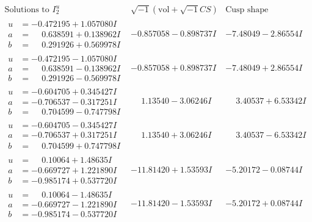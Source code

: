 \documentclass[1p]{elsarticle_modified}
\theoremstyle{definition}
\newcommand{\I}{\sqrt{-1}}
\begin{document}
$$\begin{array}{c|c|c}  
\text{Solutions to }I^u_{2}& \I (\text{vol} + \sqrt{-1}CS) & \text{Cusp shape}\\
 \hline 
\begin{aligned}
u &= -0.472195 + 1.057080 I \\
a &= \phantom{-}0.638591 + 0.138962 I \\
b &= \phantom{-}0.291926 + 0.569978 I\end{aligned}
 & -0.857058 - 0.898737 I & -7.48049 - 2.86554 I \\ \hline\begin{aligned}
u &= -0.472195 - 1.057080 I \\
a &= \phantom{-}0.638591 - 0.138962 I \\
b &= \phantom{-}0.291926 - 0.569978 I\end{aligned}
 & -0.857058 + 0.898737 I & -7.48049 + 2.86554 I \\ \hline\begin{aligned}
u &= -0.604705 + 0.345427 I \\
a &= -0.706537 - 0.317251 I \\
b &= \phantom{-}0.704599 - 0.747798 I\end{aligned}
 & \phantom{-}1.13540 - 3.06246 I & \phantom{-}3.40537 + 6.53342 I \\ \hline\begin{aligned}
u &= -0.604705 - 0.345427 I \\
a &= -0.706537 + 0.317251 I \\
b &= \phantom{-}0.704599 + 0.747798 I\end{aligned}
 & \phantom{-}1.13540 + 3.06246 I & \phantom{-}3.40537 - 6.53342 I \\ \hline\begin{aligned}
u &= \phantom{-}0.10064 + 1.48635 I \\
a &= -0.669727 + 1.221890 I \\
b &= -0.985174 + 0.537720 I\end{aligned}
 & -11.81420 + 1.53593 I & -5.20172 - 0.08744 I \\ \hline\begin{aligned}
u &= \phantom{-}0.10064 - 1.48635 I \\
a &= -0.669727 - 1.221890 I \\
b &= -0.985174 - 0.537720 I\end{aligned}
 & -11.81420 - 1.53593 I & -5.20172 + 0.08744 I \\ \hline\begin{aligned}

\end{aligned}
\end{array}$$
\end{document}
